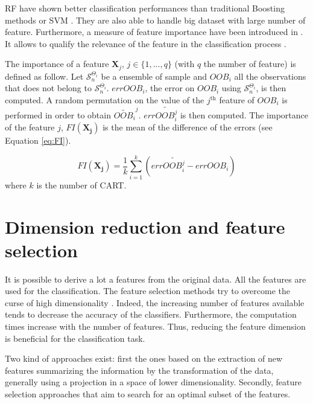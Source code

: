 RF have shown better classification performances than traditional Boosting methods \citep{breiman2001random} or SVM \citep{pal2005random}. They are also able to handle big dataset with large number of feature. Furthermore, a measure of feature importance have been introduced in \cite{breiman2001random}. It allows to qualify the relevance of the feature in the classification process \citep{strobl2007bias}.

The importance of a feature $\mathbf{X}_{j}$, $j\in\{1,...,q\}$ (with $q$ the number of feature) is defined as follow. Let $\mathcal{S}_{n}^{\Theta_{i}}$ be a ensemble of sample and $OOB_{i}$ all the observations that does not belong to $\mathcal{S}_{n}^{\Theta_{i}}$. $errOOB_{i}$, the error on $OOB_{i}$ using $\mathcal{S}_{n}^{\Theta_{i}}$, is then computed. A random permutation on the value of the $j^{\text{th}}$ feature of $OOB_{i}$ is performed in order to obtain $\widetilde{OOB_{i}}^j$. $err\widetilde{OOB_{i}^{j}}$ is then computed. The importance of the feature $j$, $FI(\mathbf{X_{j}})$ is the mean of the difference of the errors (see Equation \ref{eq:FI}).

\begin{equation}
\label{eq:FI}
FI(\mathbf{X_{j}})=\frac{1}{k}\sum_{i=1}^{k}(err\widetilde{OOB_{i}^{j}}-errOOB_{i})
\end{equation}
where $k$ is the number of CART.


\section{Dimension reduction and feature selection}
\label{sec:C1_fs}
It is possible to derive a lot a features from the original data. All the features are used for the classification. The feature selection methods try to overcome the curse of high dimensionality \citep{bellman2015adaptive, hughes1968mean}. Indeed, the increasing number of features available tends to decrease the accuracy of the classifiers. Furthermore, the computation times increase with the number of features. Thus, reducing the feature dimension is beneficial for the classification task.

Two kind of approaches exist: first the ones based on the extraction of new features summarizing the information by the transformation of the data, generally using a projection in a space of lower dimensionality. Secondly, feature selection approaches that aim to search for an optimal subset of the features.

